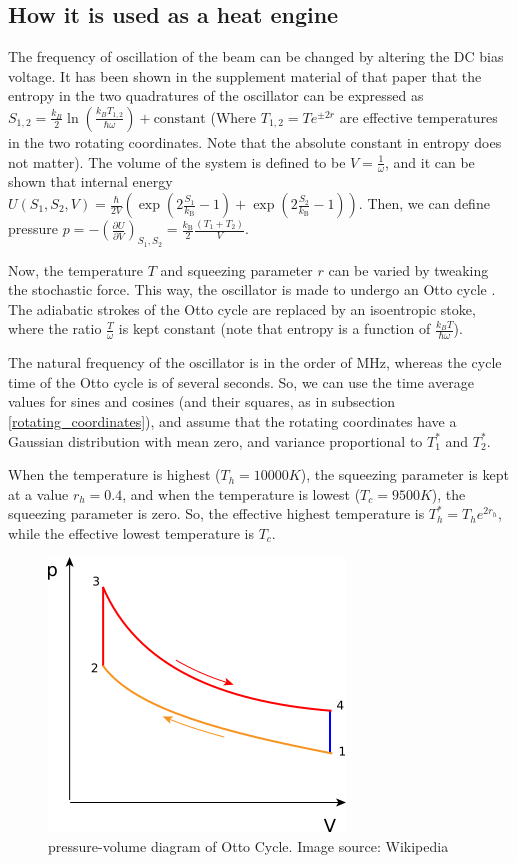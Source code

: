 \documentclass[12pt, twoside]{article}
\begin{document}
\subsection{How it is used as a heat engine}
The frequency of oscillation of the beam can be changed by altering the DC bias voltage. It has been shown in the supplement material \cite{klaers_supplement} of that paper that the entropy in the two quadratures of the oscillator can be expressed as $S_{1,2} = \frac{k_B}{2} \ln (\frac{k_B T_{1,2}}{\hbar \omega}) + \text{constant}$ (Where $T_{1,2} = T e^{\pm 2r}$ are effective temperatures in the two rotating coordinates. Note that the absolute constant in entropy does not matter). The volume of the system is defined to be $V = \frac{1}{\omega}$, and it can be shown that internal energy $U \left( S _ { 1 } , S _ { 2 } , V \right) = \frac { \hbar } { 2 V } \left( \exp \left( 2 \frac{S _ { 1 }} { k _ { \mathrm { B } }} - 1 \right) + \exp \left( 2 \frac{S _ { 2 }} { k _ { \mathrm { B } }} - 1 \right) \right)$. Then, we can define pressure $p = - \left( \frac { \partial U } { \partial V } \right) _ { S _ { 1 } , S _ { 2 } } = \frac { k _ { \mathrm { B } } } { 2 } \frac { \left( T _ { 1 } + T _ { 2 } \right) } { V }$.

Now, the temperature $T$ and squeezing parameter $r$ can be varied by tweaking the stochastic force. This way, the oscillator is made to undergo an Otto cycle \cite{resnick_halliday}. The adiabatic strokes of the Otto cycle are replaced by an isoentropic stoke, where the ratio $\frac{T}{\omega}$ is kept constant (note that entropy is a function of $\frac{k_B T}{\hbar \omega}$).

The natural frequency of the oscillator is in the order of MHz, whereas the cycle time of the Otto cycle is of several seconds. So, we can use the time average values for sines and cosines (and their squares, as in subsection \ref{rotating_coordinates}), and assume that the rotating coordinates have a Gaussian distribution with mean zero, and variance proportional to $T^*_1$ and $T^*_2$.

When the temperature is highest ($T_h = 10000 K$), the squeezing parameter is kept at a value $r_h = 0.4$, and when the temperature is lowest ($T_c = 9500 K$), the squeezing parameter is zero. So, the effective highest temperature is $T^*_h = T_h e^{2r_h}$, while the effective lowest temperature is $T_c$.

\begin{figure}[h!]
	\centering
	\includegraphics[width=0.4\linewidth]{graphs/P-V_Otto_cycle.png}
	\caption{pressure-volume diagram of Otto Cycle. Image source: Wikipedia \cite{image_reference}}
	\label{fig:Otto_cycle}
\end{figure}
\end{document}
